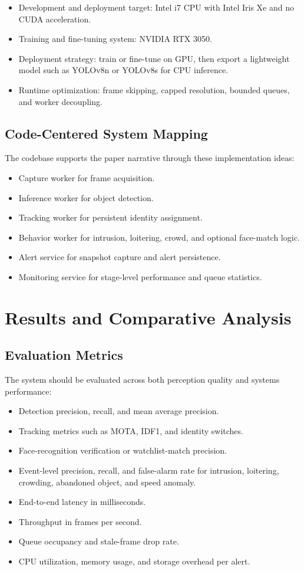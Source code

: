 \documentclass[11pt]{article}
\begin{document}
\begin{itemize}
\item Development and deployment target: Intel i7 CPU with Intel Iris Xe and no CUDA acceleration.
\item Training and fine-tuning system: NVIDIA RTX 3050.
\item Deployment strategy: train or fine-tune on GPU, then export a lightweight model such as YOLOv8n or YOLOv8s for CPU inference.
\item Runtime optimization: frame skipping, capped resolution, bounded queues, and worker decoupling.
\end{itemize}

\subsection{Code-Centered System Mapping}
The codebase supports the paper narrative through these implementation ideas:

\begin{itemize}
\item Capture worker for frame acquisition.
\item Inference worker for object detection.
\item Tracking worker for persistent identity assignment.
\item Behavior worker for intrusion, loitering, crowd, and optional face-match logic.
\item Alert service for snapshot capture and alert persistence.
\item Monitoring service for stage-level performance and queue statistics.
\end{itemize}

\section{Results and Comparative Analysis}

\subsection{Evaluation Metrics}
The system should be evaluated across both perception quality and systems performance:

\begin{itemize}
\item Detection precision, recall, and mean average precision.
\item Tracking metrics such as MOTA, IDF1, and identity switches.
\item Face-recognition verification or watchlist-match precision.
\item Event-level precision, recall, and false-alarm rate for intrusion, loitering, crowding, abandoned object, and speed anomaly.
\item End-to-end latency in milliseconds.
\item Throughput in frames per second.
\item Queue occupancy and stale-frame drop rate.
\item CPU utilization, memory usage, and storage overhead per alert.
\end{itemize}
\end{document}
